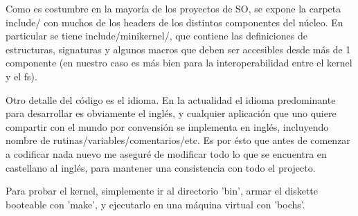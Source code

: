Como es costumbre en la mayoría de los proyectos de SO, se expone la carpeta
include/ con muchos de los headers de los distintos componentes del núcleo. En
particular se tiene include/minikernel/, que contiene las definiciones de
estructuras, signaturas y algunos macros que deben ser accesibles desde más de
1 componente (en nuestro caso es más bien para la interoperabilidad entre el
kernel y el fs).

Otro detalle del código es el idioma. En la actualidad el idioma predominante
para desarrollar es obviamente el inglés, y cualquier aplicación que uno quiere
compartir con el mundo por convensión se implementa en inglés, incluyendo nombre
de rutinas/variables/comentarios/etc. Es por ésto que antes de comenzar a
codificar nada nuevo me aseguré de modificar todo lo que se encuentra en
castellano al inglés, para mantener una consistencia con todo el projecto.

Para probar el kernel, simplemente ir al directorio 'bin', armar el diskette
booteable con 'make', y ejecutarlo en una máquina virtual con 'bochs'.

